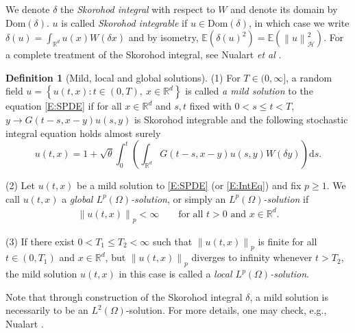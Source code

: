 \documentclass[a4paper,11pt]{article}
\numberwithin{equation}{section}
\numberwithin{equation}{section}
\theoremstyle{plain}
\theoremstyle{definition}
\newtheorem{definition}[theorem]{Definition}
\newcommand{\E}{\mathbb{E}}
\newcommand{\ud}{\ensuremath{\mathrm{d} }}
\newcommand{\Norm}[1]{\left\|  #1   \right\|}
\newcommand{\R}{\mathbb{R}}
\begin{document}
We denote $\delta$ the {\it Skorohod integral} with respect to $W$ and denote its domain by
$\text{Dom}(\delta)$. $u$ is called {\it Skorohod integrable} if $u\in \text{Dom}(\delta)$, in which
case we write $\delta(u) = \int_{\R^d} u(x) W(\delta x)$ and by isometry,
$\E\left(\delta(u)^2\right)=\E(\Norm{u}_{\mathcal{H}}^2)$. For a complete treatment of the Skorohod
integral, see Nualart {\it et al} \cite{Nualart18Book}.

\begin{definition}[Mild, local and global solutions] \label{D:Sol}
  (1) For $T\in (0,\infty]$, a random field $u=\left\{u(t,x) : t \in (0,T),\: x\in\R^d\right\}$ is
  called {\it a mild solution} to the equation \eqref{E:SPDE} if for all $x\in\R^d$ and $s,t$ fixed
  with $0<s\le t <T$, $y\to G(t-s,x-y)u(s,y)$ is Skorohod integrable and the following stochastic
  integral equation holds almost surely
  \begin{equation} \label{E:IntEq}
    u(t,x) = 1 + \sqrt{\theta}\int_0^t \left( \int_{\R^d} G(t-s,x-y)u(s,y) W(\delta y) \right)\ud s.
  \end{equation}

  \noindent (2) Let $u(t,x)$ be a mild solution to \eqref{E:SPDE} (or \eqref{E:IntEq}) and fix $p\ge
  1$. We call $u(t,x)$ a {\it global $L^p(\Omega)$-solution}, or simply an {\it
  $L^p(\Omega)$-solution} if
  \begin{align} \label{E:Lp}
    \Norm{u(t,x)}_p < \infty \qquad \text{for all $t>0$ and $x \in \R^d$.}
  \end{align}

  \noindent (3) If there exist $0<T_1\le T_2<\infty$ such that $\Norm{u(t,x)}_p$ is finite for all
  $t\in(0,T_1)$ and $x\in\R^d$, but $\Norm{u(t,x)}_p$ diverges to infinity whenever $t>T_2$, the mild
  solution $u(t,x)$ in this case is called a {\it local $L^p(\Omega)$-solution}.
\end{definition}

Note that through construction of the Skorohod integral $\delta$, a mild solution is necessarily to
be an $L^2(\Omega)$-solution.  For more details, one may check, e.g., Nualart \cite[Chapter
3]{Nualart18Book}.  \bigskip

\end{document}
